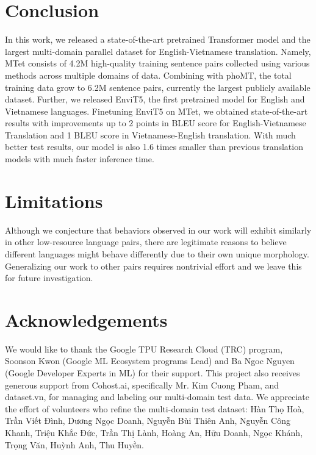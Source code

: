 \documentclass[11pt]{article}
\begin{document}
\section{Conclusion}
In this work, we released a state-of-the-art pretrained Transformer model and the largest multi-domain parallel dataset for English-Vietnamese translation. Namely,
MTet consists of 4.2M high-quality training sentence pairs collected using various methods across multiple domains of data. Combining with phoMT, the total training data grow to 6.2M sentence pairs, currently the largest publicly available dataset. Further, we released EnviT5, the first pretrained model for English and Vietnamese languages. Finetuning EnviT5 on MTet, we obtained state-of-the-art results with improvements up to 2 points in BLEU score for English-Vietnamese Translation and 1 BLEU score in Vietnamese-English translation. With much better test results, our model is also 1.6 times smaller than previous translation models with much faster inference time.




%
 
\section{Limitations}
Although we conjecture that behaviors observed in our work will exhibit similarly in other low-resource language pairs, there are legitimate reasons to believe different languages might behave differently due to their own unique morphology. Generalizing our work to other pairs requires nontrivial effort and we leave this for future investigation. 


\section{Acknowledgements}
We would like to thank the Google TPU Research Cloud (TRC) program, Soonson Kwon (Google ML Ecosystem programs Lead) and Ba Ngoc Nguyen (Google Developer Experts in ML) for their support. This project also receives generous support from Cohost.ai, specifically Mr. Kim Cuong Pham, and dataset.vn, for managing and labeling our multi-domain test data. We appreciate the effort of volunteers who refine the multi-domain test dataset: Hàn Thọ Hoà, Trần Viết Đình, Dương Ngọc Doanh, Nguyễn Bùi Thiên Anh, Nguyễn Công Khanh, Triệu Khắc Đức, Trần Thị Lành, Hoàng An, Hữu Doanh, Ngọc Khánh, Trọng Văn, Huỳnh Anh, Thu Huyền.




\end{document}
